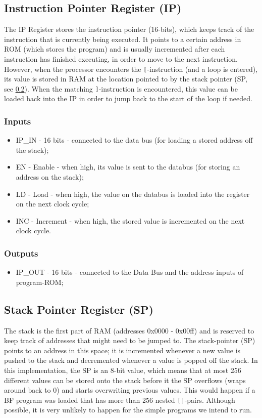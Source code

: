 \subsection{Instruction Pointer Register (IP)} \label{sec:architecture:ip}
The IP Register stores the instruction pointer (16-bits), which keeps track of the instruction that is currently being executed. It points to a certain address in ROM (which stores the program) and is usually incremented after each instruction has finished executing, in order to move to the next instruction. However, when the processor encounters the \texttt{[}-instruction (and a loop is entered), its value is stored in RAM at the location pointed to by the stack pointer (SP, see \ref{sec:architecture:sp}). When the matching \texttt{]}-instruction is encountered, this value can be loaded back into the IP in order to jump back to the start of the loop if needed.

\subsubsection*{Inputs}
\begin{itemize}
\itemsep0em 
\item IP\_IN - 16 bits - connected to the data bus (for loading a stored address off the stack);
\item EN - Enable - when high, its value is sent to the databus (for storing an address on the stack);
\item LD - Load - when high, the value on the databus is loaded into the register on the next clock cycle;
\item INC - Increment - when high, the stored value is incremented on the next clock cycle.
\end{itemize}

\subsubsection*{Outputs}
\begin{itemize}
\itemsep0em 
\item IP\_OUT - 16 bits - connected to the Data Bus and the address inputs of program-ROM;
\end{itemize}


\subsection{Stack Pointer Register (SP)} \label{sec:architecture:sp}
The stack is the first part of RAM (addresses 0x0000 - 0x00ff) and is reserved to keep track of addresses that might need to be jumped to. The stack-pointer (SP) points to an address in this space; it is incremented whenever a new value is pushed to the stack and decremented whenever a value is popped off the stack. In this implementation, the SP is an 8-bit value, which means that at most 256 different values can be stored onto the stack before it the SP overflows (wraps around back to 0) and starts overwriting previous values. This would happen if a BF program was loaded that has more than 256 nested \texttt{[]}-pairs. Although possible, it is very unlikely to happen for the simple programs we intend to run.

